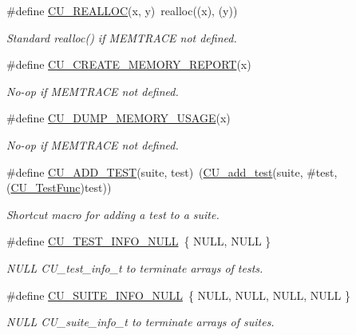 \begin{DoxyCompactItemize}
\#define \hyperlink{group___framework_ga60067c844199888e97bb2a63411a2a88}{C\+U\+\_\+\+R\+E\+A\+L\+L\+O\+C}(x, y)~realloc((x), (y))
\begin{DoxyCompactList}\small\item\em Standard realloc() if M\+E\+M\+T\+R\+A\+C\+E not defined. \end{DoxyCompactList}\item 
\#define \hyperlink{group___framework_ga87f2f74a75005dff52cf8f3950dace7f}{C\+U\+\_\+\+C\+R\+E\+A\+T\+E\+\_\+\+M\+E\+M\+O\+R\+Y\+\_\+\+R\+E\+P\+O\+R\+T}(x)
\begin{DoxyCompactList}\small\item\em No-\/op if M\+E\+M\+T\+R\+A\+C\+E not defined. \end{DoxyCompactList}\item 
\#define \hyperlink{group___framework_ga08a41107806ccf43676758c0dea5d3b2}{C\+U\+\_\+\+D\+U\+M\+P\+\_\+\+M\+E\+M\+O\+R\+Y\+\_\+\+U\+S\+A\+G\+E}(x)
\begin{DoxyCompactList}\small\item\em No-\/op if M\+E\+M\+T\+R\+A\+C\+E not defined. \end{DoxyCompactList}\item 
\#define \hyperlink{group___framework_ga2d4a4721607c68a97f61ff1c25abfe21}{C\+U\+\_\+\+A\+D\+D\+\_\+\+T\+E\+S\+T}(suite, test)~(\hyperlink{group___framework_gad9f198a8a5fa8cc6870c3c8be873869f}{C\+U\+\_\+add\+\_\+test}(suite, \#test, (\hyperlink{group___framework_ga5868148b642b30635b8fe7f095c5b493}{C\+U\+\_\+\+Test\+Func})test))
\begin{DoxyCompactList}\small\item\em Shortcut macro for adding a test to a suite. \end{DoxyCompactList}\item 
\#define \hyperlink{group___framework_gab9f0524d334d5fb412adb49ce8227600}{C\+U\+\_\+\+T\+E\+S\+T\+\_\+\+I\+N\+F\+O\+\_\+\+N\+U\+L\+L}~\{ N\+U\+L\+L, N\+U\+L\+L \}
\begin{DoxyCompactList}\small\item\em N\+U\+L\+L C\+U\+\_\+test\+\_\+info\+\_\+t to terminate arrays of tests. \end{DoxyCompactList}\item 
\#define \hyperlink{group___framework_ga6dbb9f7e589b77ea1bbf2d29fae65f1a}{C\+U\+\_\+\+S\+U\+I\+T\+E\+\_\+\+I\+N\+F\+O\+\_\+\+N\+U\+L\+L}~\{ N\+U\+L\+L, N\+U\+L\+L, N\+U\+L\+L, N\+U\+L\+L \}
\begin{DoxyCompactList}\small\item\em N\+U\+L\+L C\+U\+\_\+suite\+\_\+info\+\_\+t to terminate arrays of suites. \end{DoxyCompactList}\item 

\end{DoxyCompactItemize}
